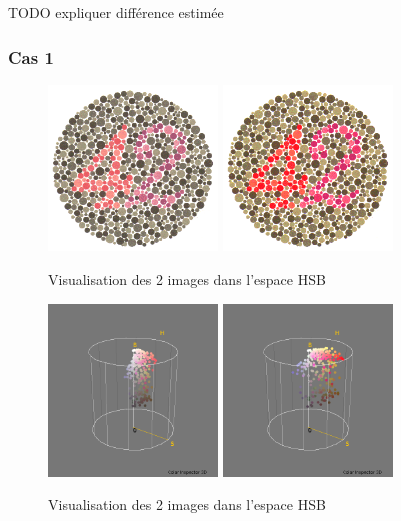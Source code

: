 \documentclass[a4paper]{article}
\begin{document}
TODO expliquer différence estimée

\clearpage
\subsubsection{Cas 1}

\begin{figure}[H]
\begin{center}
\includegraphics[width=170px]{../base/cas_1_dalton42.png}
\includegraphics[width=170px]{../base/cas_1_dalton42-question2-2.png}
\end{center}
\caption{Visualisation des 2 images dans l'espace HSB}
\end{figure}

\begin{figure}[H]
\begin{center}
\includegraphics[width=170px]{../resultats/e2_q2_k1_42.png}
\includegraphics[width=170px]{../resultats/e2_q2_k1_modif.png}
\end{center}
\caption{Visualisation des 2 images dans l'espace HSB}
\end{figure}
\end{document}
